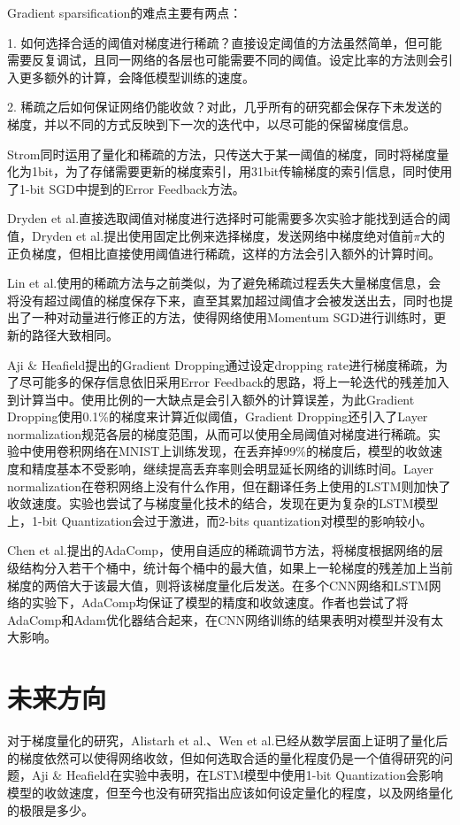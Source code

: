 \documentclass[12pt,onecolumn,letterpaper]{article}
\begin{document}
    Gradient sparsification的难点主要有两点：

    1. 如何选择合适的阈值对梯度进行稀疏？直接设定阈值的方法虽然简单，但可能需要反复调试，且同一网络的各层也可能需要不同的阈值。设定比率的方法则会引入更多额外的计算，会降低模型训练的速度。

    2. 稀疏之后如何保证网络仍能收敛？对此，几乎所有的研究都会保存下未发送的梯度，并以不同的方式反映到下一次的迭代中，以尽可能的保留梯度信息。

    Strom\cite{International}同时运用了量化和稀疏的方法，只传送大于某一阈值的梯度，同时将梯度量化为1bit，为了存储需要更新的梯度索引，用31bit传输梯度的索引信息，同时使用了1-bit SGD中提到的Error Feedback方法。

    Dryden et al.\cite{Dryden2016}直接选取阈值对梯度进行选择时可能需要多次实验才能找到适合的阈值，Dryden et al.提出使用固定比例来选择梯度，发送网络中梯度绝对值前$\pi$大的正负梯度，但相比直接使用阈值进行稀疏，这样的方法会引入额外的计算时间。

    Lin et al.\cite{Lin2017}使用的稀疏方法与之前类似，为了避免稀疏过程丢失大量梯度信息，会将没有超过阈值的梯度保存下来，直至其累加超过阈值才会被发送出去，同时也提出了一种对动量进行修正的方法，使得网络使用Momentum SGD进行训练时，更新的路径大致相同。

    Aji \& Heafield\cite{Aji2017}提出的Gradient Dropping通过设定dropping rate进行梯度稀疏，为了尽可能多的保存信息依旧采用Error Feedback的思路，将上一轮迭代的残差加入到计算当中。使用比例的一大缺点是会引入额外的计算误差，为此Gradient Dropping使用0.1\%的梯度来计算近似阈值，Gradient Dropping还引入了Layer normalization\cite{Ba2016}规范各层的梯度范围，从而可以使用全局阈值对梯度进行稀疏。实验中使用卷积网络在MNIST上训练发现，在丢弃掉99\%的梯度后，模型的收敛速度和精度基本不受影响，继续提高丢弃率则会明显延长网络的训练时间。Layer normalization\cite{Ba2016}在卷积网络上没有什么作用，但在翻译任务上使用的LSTM则加快了收敛速度。实验也尝试了与梯度量化技术的结合，发现在更为复杂的LSTM模型上，1-bit Quantization会过于激进，而2-bits quantization对模型的影响较小。

    Chen et al.\cite{Chen}提出的AdaComp，使用自适应的稀疏调节方法，将梯度根据网络的层级结构分入若干个桶中，统计每个桶中的最大值，如果上一轮梯度的残差加上当前梯度的两倍大于该最大值，则将该梯度量化后发送。在多个CNN网络和LSTM网络的实验下，AdaComp均保证了模型的精度和收敛速度。作者也尝试了将AdaComp和Adam优化器结合起来，在CNN网络训练的结果表明对模型并没有太大影响。


    \section{未来方向}
    对于梯度量化的研究，Alistarh et al.\cite{Alistarh}、Wen et al.\cite{Wen}已经从数学层面上证明了量化后的梯度依然可以使得网络收敛，但如何选取合适的量化程度仍是一个值得研究的问题，Aji \& Heafield\cite{Aji2017}在实验中表明，在LSTM模型中使用1-bit Quantization会影响模型的收敛速度，但至今也没有研究指出应该如何设定量化的程度，以及网络量化的极限是多少。
\end{document}
